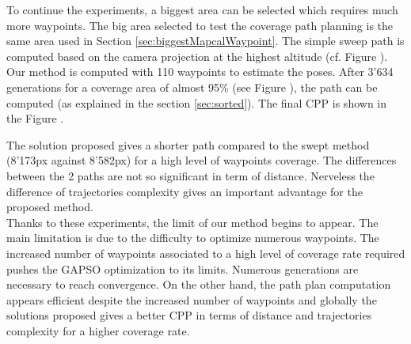 To continue the experiments, a biggest area can be selected which requires much more waypoints. The big area selected to test the coverage path planning is the same area used in Section \ref{sec:biggestMapcalWaypoint}. 
The simple sweep path is computed based on the camera projection at the highest altitude (cf. Figure ). Our method is computed  with 110 waypoints to estimate the poses. After 3'634 generations for a coverage area of almost 95\% (see Figure ), the path  can be computed (as explained in the section \ref{sec:sorted}).  The final CPP is shown in the Figure . 

The solution proposed gives a shorter path compared to the swept method (8'173px against 8'582px) for a high level of waypoints coverage. The differences between the 2 paths are not so significant  %
in term of distance. Nerveless the difference of trajectories complexity gives an important advantage for the proposed method.\\
Thanks to these experiments, the limit of our method begins to appear. The main limitation is due to the difficulty to optimize numerous waypoints. %
 The increased number of waypoints associated to a high level of coverage rate required pushes the GAPSO optimization to its limits. Numerous generations are necessary to reach convergence. On the other hand, the path plan computation appears efficient despite the increased number of waypoints and globally the solutions proposed gives a better CPP in terms of distance and trajectories complexity for a higher coverage rate.


 
 
